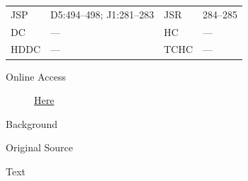 					\begin{tabular}{p{0.5in}p{1in}p{0.5in}p{1in}}
					JSP	 	& D5:494--498; J1:281--283		& JSR 		& 284--285 \\
					DC	 	& ---		& HC 		& --- \\
					HDDC 	& ---		& TCHC 		& --- \\
					\end{tabular}
				
				\begin{description}
					\item[Online Access] \href{https://www.josephsmithpapers.org/paper-summary/revelation-12-january-1838-a/1}{Here}
				\end{description}
				
				\begin{description}
					\item[Background]
				\end{description}
				
				
				\begin{description}
					\item[Original Source]
				\end{description}
				
				
				\begin{description}
					\item[Text]
				\end{description}
				

